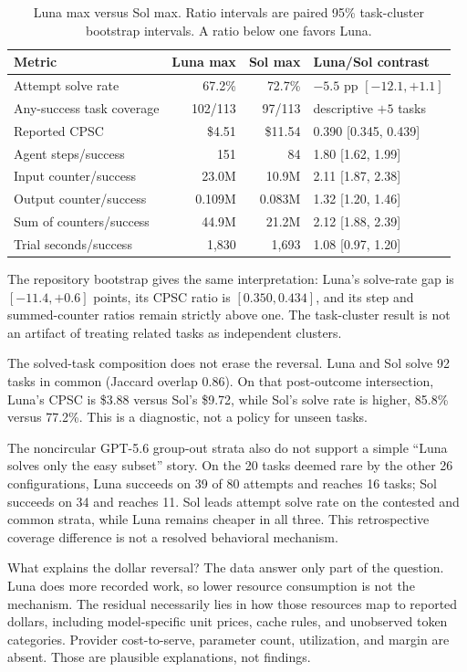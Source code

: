 \documentclass[11pt]{article}
\newcommand{\usd}[1]{\$#1}
\begin{document}
\begin{table}[H]
\centering
\small
\caption{Luna max versus Sol max. Ratio intervals are paired 95\% task-cluster bootstrap
intervals. A ratio below one favors Luna.}
\label{tab:lunasol}
\begin{tabular}{@{}lrrl@{}}
\toprule
Metric & Luna max & Sol max & Luna/Sol contrast \\
\midrule
Attempt solve rate & 67.2\% & 72.7\% & $-5.5$ pp $[-12.1,+1.1]$ \\
Any-success task coverage & 102/113 & 97/113 & descriptive $+5$ tasks \\
Reported CPSC & \usd{4.51} & \usd{11.54} & 0.390 [0.345, 0.439] \\
Agent steps/success & 151 & 84 & 1.80 [1.62, 1.99] \\
Input counter/success & 23.0M & 10.9M & 2.11 [1.87, 2.38] \\
Output counter/success & 0.109M & 0.083M & 1.32 [1.20, 1.46] \\
Sum of counters/success & 44.9M & 21.2M & 2.12 [1.88, 2.39] \\
Trial seconds/success & 1,830 & 1,693 & 1.08 [0.97, 1.20] \\
\bottomrule
\end{tabular}
\end{table}

The repository bootstrap gives the same interpretation: Luna's solve-rate gap is
$[-11.4,+0.6]$ points, its CPSC ratio is $[0.350,0.434]$, and its step and summed-counter ratios
remain strictly above one. The task-cluster result is not an artifact of treating related tasks as
independent clusters.

The solved-task composition does not erase the reversal. Luna and Sol solve 92 tasks in common
(Jaccard overlap 0.86). On that post-outcome intersection, Luna's CPSC is \usd{3.88} versus
Sol's \usd{9.72}, while Sol's solve rate is higher, 85.8\% versus 77.2\%. This is a diagnostic, not
a policy for unseen tasks.

The noncircular GPT-5.6 group-out strata also do not support a simple ``Luna solves only the easy
subset'' story. On the 20 tasks deemed rare by the other 26 configurations, Luna succeeds on 39 of
80 attempts and reaches 16 tasks; Sol succeeds on 34 and reaches 11. Sol leads attempt solve rate on
the contested and common strata, while Luna remains cheaper in all three. This retrospective
coverage difference is not a resolved behavioral mechanism.

What explains the dollar reversal? The data answer only part of the question. Luna does more
recorded work, so lower resource consumption is not the mechanism. The residual necessarily lies
in how those resources map to reported dollars, including model-specific unit prices, cache rules,
and unobserved token categories. Provider cost-to-serve, parameter count, utilization, and margin
are absent. Those are plausible explanations, not findings.
\end{document}
